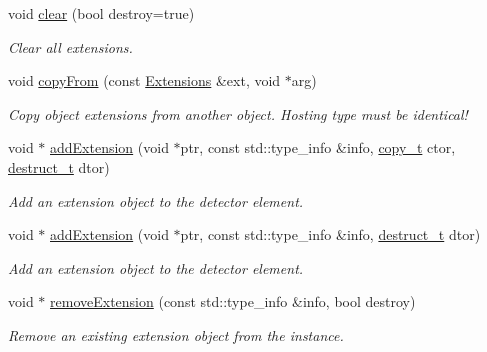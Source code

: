 \begin{DoxyCompactItemize}
void \hyperlink{class_d_d4hep_1_1_object_extensions_a8f55762fa8f1701f8fda19a25b027168}{clear} (bool destroy=true)
\begin{DoxyCompactList}\small\item\em Clear all extensions. \item\end{DoxyCompactList}\item 
void \hyperlink{class_d_d4hep_1_1_object_extensions_a45c52f32737b70516b0ee96ddd3e14be}{copyFrom} (const \hyperlink{class_d_d4hep_1_1_object_extensions_a882c1e22567a450f60d83eb735dd3532}{Extensions} \&ext, void $\ast$arg)
\begin{DoxyCompactList}\small\item\em Copy object extensions from another object. Hosting type must be identical! \item\end{DoxyCompactList}\item 
void $\ast$ \hyperlink{class_d_d4hep_1_1_object_extensions_acfe9fe435a30ca5fedd0678b867732a0}{addExtension} (void $\ast$ptr, const std::type\_\-info \&info, \hyperlink{class_d_d4hep_1_1_object_extensions_ab58b60490186d1adc0c5585ad691a7c2}{copy\_\-t} ctor, \hyperlink{class_d_d4hep_1_1_object_extensions_af9ca2813f0d7fa65ac13d905d9721cdf}{destruct\_\-t} dtor)
\begin{DoxyCompactList}\small\item\em Add an extension object to the detector element. \item\end{DoxyCompactList}\item 
void $\ast$ \hyperlink{class_d_d4hep_1_1_object_extensions_a9e4010c2b9cbfda1455c10821a3cae85}{addExtension} (void $\ast$ptr, const std::type\_\-info \&info, \hyperlink{class_d_d4hep_1_1_object_extensions_af9ca2813f0d7fa65ac13d905d9721cdf}{destruct\_\-t} dtor)
\begin{DoxyCompactList}\small\item\em Add an extension object to the detector element. \item\end{DoxyCompactList}\item 
void $\ast$ \hyperlink{class_d_d4hep_1_1_object_extensions_a4ee557d0bcce3b57dd6f462a6967dd6b}{removeExtension} (const std::type\_\-info \&info, bool destroy)
\begin{DoxyCompactList}\small\item\em Remove an existing extension object from the instance. \item\end{DoxyCompactList}\item 

\end{DoxyCompactItemize}
